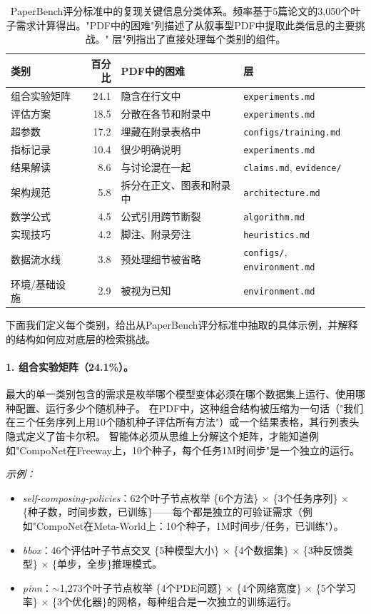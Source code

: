 \begin{table}[h]
\centering
\small
\begin{tabular}{p{3.2cm}rp{3.6cm}l}
\toprule
\textbf{类别} & \textbf{百分比} & \textbf{PDF中的困难} & \textbf{\ara{} 层} \\
\midrule
组合实验矩阵 & 24.1 & 隐含在行文中 & \texttt{experiments.md} \\
评估方案 & 18.5 & 分散在各节和附录中 & \texttt{experiments.md} \\
超参数 & 17.2 & 埋藏在附录表格中 & \texttt{configs/training.md} \\
指标记录 & 10.4 & 很少明确说明 & \texttt{experiments.md} \\
结果解读 & 8.6 & 与讨论混在一起 & \texttt{claims.md}, \texttt{evidence/} \\
架构规范 & 5.8 & 拆分在正文、图表和附录中 & \texttt{architecture.md} \\
数学公式 & 4.5 & 公式引用跨节断裂 & \texttt{algorithm.md} \\
实现技巧 & 4.2 & 脚注、附录旁注 & \texttt{heuristics.md} \\
数据流水线 & 3.8 & 预处理细节被省略 & \texttt{configs/}, \texttt{environment.md} \\
环境/基础设施 & 2.9 & 被视为已知 & \texttt{environment.md} \\
\bottomrule
\end{tabular}
\caption{PaperBench评分标准中的复现关键信息分类体系。频率基于5篇论文的3{,}050个叶子需求计算得出。"PDF中的困难"列描述了从叙事型PDF中提取此类信息的主要挑战。"\ara{} 层"列指出了直接处理每个类别的\ara{}组件。}
\label{tbl-taxonomy}
\end{table}

下面我们定义每个类别，给出从PaperBench评分标准中抽取的具体示例，并解释\ara{}的结构如何应对底层的检索挑战。

\paragraph{1. 组合实验矩阵（24.1\%）。}
最大的单一类别包含的需求是枚举哪个模型变体必须在哪个数据集上运行、使用哪种配置、运行多少个随机种子。
在PDF中，这种组合结构被压缩为一句话（"我们在三个任务序列上用10个随机种子评估所有方法"）或一个结果表格，其行列表头隐式定义了笛卡尔积。
智能体必须从思维上分解这个矩阵，才能知道例如"CompoNet在Freeway上，10个种子，每个任务1M时间步"是一个独立的运行。

\emph{示例：}
\begin{itemize}[leftmargin=*, itemsep=1pt]
  \item \emph{self-composing-policies}：62个叶子节点枚举 \{6个方法\} $\times$ \{3个任务序列\} $\times$ \{种子数，时间步数，已训练\}——每个都是独立的可验证需求（例如"CompoNet在Meta-World上：10个种子，1M时间步/任务，已训练"）。
  \item \emph{bbox}：46个评估叶子节点交叉 \{5种模型大小\} $\times$ \{4个数据集\} $\times$ \{3种反馈类型\} $\times$ \{单步，全步\}推理模式。
  \item \emph{pinn}：$\sim$1{,}273个叶子节点枚举 \{4个PDE问题\} $\times$ \{4个网络宽度\} $\times$ \{5个学习率\} $\times$ \{3个优化器\}的网格，每种组合是一次独立的训练运行。
\end{itemize}

